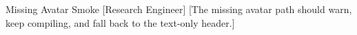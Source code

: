 \documentclass{inkumo}
\begin{document}
\inkumoheader
  {Missing Avatar Smoke}
  {%
    \contactsep
  }
  [Research Engineer]
  [The missing avatar path should warn, keep compiling, and fall back to the text-only header.]
\end{document}
